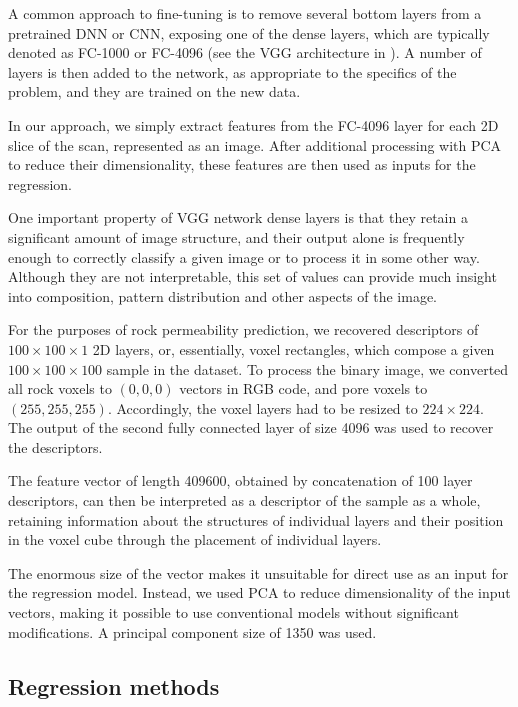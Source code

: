 \documentclass[review]{elsarticle}
\begin{document}
A common approach to fine-tuning is to remove several bottom layers from a pretrained DNN or CNN, exposing one of the dense layers, which are typically denoted as FC-1000 or FC-4096 (see the VGG architecture in \cite{simonyan2014very}). A number of layers is then added to the network, as appropriate to the specifics of the problem, and they are trained on the new data.

In our approach, we simply extract features from the FC-4096 layer for each 2D slice of the scan, represented as an image. After additional processing with PCA to reduce their dimensionality, these features are then used as inputs for the regression.

One important property of VGG network dense layers is that they retain a significant amount of image structure, and their output alone is frequently enough to correctly classify a given image or to process it in some other way. Although they are not interpretable, this set of values can provide much insight into composition, pattern distribution and other aspects of the image.

For the purposes of rock permeability prediction, we recovered descriptors of $100 \times 100 \times 1$ 2D layers, or, essentially, voxel rectangles, which compose a given $100 \times 100 \times 100$ sample in the dataset. To process the binary image, we converted all rock voxels to $(0, 0, 0)$ vectors in RGB code, and pore voxels to $(255, 255, 255)$. Accordingly, the voxel layers had to be resized to $224 \times 224$. The output of the second fully connected layer of size 4096 was used to recover the descriptors.

The feature vector of length 409600, obtained by concatenation of 100 layer descriptors, can then be interpreted as a descriptor of the sample as a whole, retaining information about the structures of individual layers and their position in the voxel cube through the placement of individual layers.

The enormous size of the vector makes it unsuitable for direct use as an input for the regression model. Instead, we used PCA to reduce dimensionality of the input vectors, making it possible to use conventional models without significant modifications. A principal component size of 1350 was used.

\subsection{Regression methods}
\end{document}
